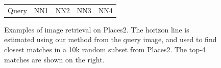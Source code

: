 \begin{figure}[!ht]
\begin{tabular}{c|cccc}
Query & NN1 & NN2 & NN3 & NN4
\end{tabular}
\vspace{1em}
\caption{Examples of image retrieval on Places2. The horizon line is estimated using our method from the query image, and used to find  closest matches in a 10k random subset from Places2. The top-4 matches are shown on the right.}
\label{fig:applications_retrieval}
\end{figure}


